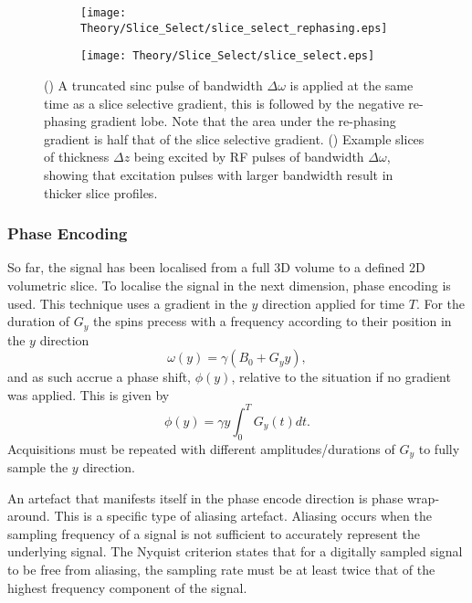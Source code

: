 \begin{figure}[H]
	\centering
	\begin{subfigure}[c]{0.47\textwidth}
		\centering
		\texttt{[image: Theory/Slice\_Select/slice\_select\_rephasing.eps]}
		\caption{}
		\label{fig:theory_slice_select_rephasing}
	\end{subfigure}
	\hfill
	\begin{subfigure}[c]{0.47\textwidth}
		\centering
		\texttt{[image: Theory/Slice\_Select/slice\_select.eps]}
		\caption{}
		\label{fig:theory_slice_select_profile}
	\end{subfigure}
	\caption{() A truncated sinc pulse of bandwidth $\Delta \omega$ is applied at the same time as a slice selective gradient, this is followed by the negative re-phasing gradient lobe. Note that the area under the re-phasing gradient is half that of the slice selective gradient. () Example slices of thickness $\Delta z$ being excited by \ac{RF} pulses of bandwidth $\Delta \omega$, showing that excitation pulses with larger bandwidth result in thicker slice profiles.}
	\label{fig:theory_slice_select}
\end{figure}
\subsubsection{Phase Encoding}
So far, the signal has been localised from a full 3D volume to a defined 2D volumetric slice. To localise the signal in the next dimension, phase encoding is used. This technique uses a gradient in the $y$ direction applied for time $T$. For the duration of $G_y$ the spins precess with a frequency according to their position in the $y$ direction
\begin{equation}
\omega \left( y\right) = \gamma\left( B_0 + G_yy\right),
\end{equation}
and as such accrue a phase shift, $\phi \left( y \right)$, relative to the situation if no gradient was applied. This is given by 
\begin{equation}
\phi\left( y\right)  = \gamma y \int_{0}^{T} G_y\left( t\right) dt.
\end{equation}
Acquisitions must be repeated with different amplitudes/durations of $G_y$ to fully sample the $y$ direction.

An artefact that manifests itself in the phase encode direction is phase wrap-around. This is a specific type of aliasing artefact. Aliasing occurs when the sampling frequency of a signal is not sufficient to accurately represent the underlying signal. The Nyquist criterion states that for a digitally sampled signal to be free from aliasing, the sampling rate must be at least twice that of the highest frequency component of the signal.

